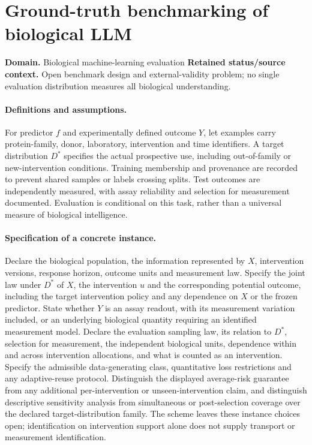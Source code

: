 \documentclass[11pt]{article}
\begin{document}
\section*{Ground-truth benchmarking of biological LLM}
\label{prob:080}
\label{rank:227}
\par\smallskip

\noindent\textbf{Domain.} Biological machine-learning evaluation \quad \textbf{Retained status/source context.} Open benchmark design and external-validity problem; no single evaluation distribution measures all biological understanding.
\paragraph{Definitions and assumptions.} For predictor $f$ and experimentally defined outcome $Y$, let examples carry protein-family, donor, laboratory, intervention and time identifiers. A target distribution $D^*$ specifies the actual prospective use, including out-of-family or new-intervention conditions. Training membership and provenance are recorded to prevent shared samples or labels crossing splits. Test outcomes are independently measured, with assay reliability and selection for measurement documented. Evaluation is conditional on this task, rather than a universal measure of biological intelligence.
\paragraph{Specification of a concrete instance.} Declare the biological population, the information represented by $X$, intervention versions, response horizon, outcome units and measurement law. Specify the joint law under $D^*$ of $X$, the intervention $u$ and the corresponding potential outcome, including the target intervention policy and any dependence on $X$ or the frozen predictor. State whether $Y$ is an assay readout, with its measurement variation included, or an underlying biological quantity requiring an identified measurement model. Declare the evaluation sampling law, its relation to $D^*$, selection for measurement, the independent biological units, dependence within and across intervention allocations, and what is counted as an intervention. Specify the admissible data-generating class, quantitative loss restrictions and any adaptive-reuse protocol. Distinguish the displayed average-risk guarantee from any additional per-intervention or unseen-intervention claim, and distinguish descriptive sensitivity analysis from simultaneous or post-selection coverage over the declared target-distribution family. The scheme leaves these instance choices open; identification on intervention support alone does not supply transport or measurement identification.
\end{document}
